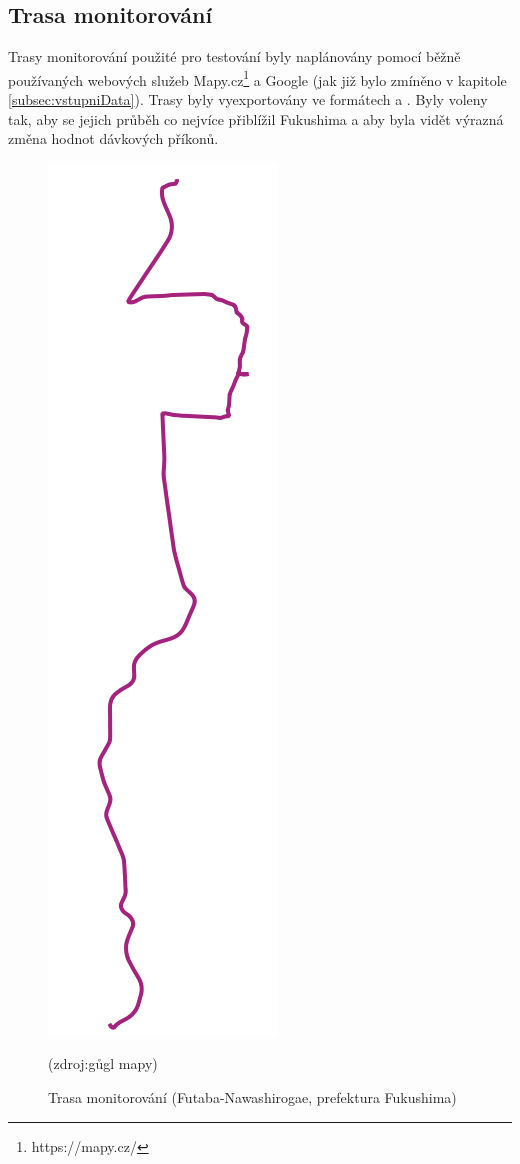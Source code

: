 \subsection{Trasa monitorování}
Trasy monitorování použité pro testování byly naplánovány pomocí běžně používaných webových služeb Mapy.cz\footnote{https://mapy.cz/} a Google (jak již bylo zmíněno v kapitole \ref{subsec:vstupniData}). Trasy byly vyexportovány ve formátech  a . Byly voleny tak, aby se jejich průběh co nejvíce přiblížil  Fukushima a aby byla vidět výrazná změna hodnot dávkových příkonů.

\begin{figure}[H]
    \centering
    \includegraphics[scale=0.2]{./pictures/trasa_monitorovani.png}
      	\caption[Trasa monitorování (Futaba-Nawashirogae, prefektura Fukushima)]{Trasa monitorování (Futaba-Nawashirogae, prefektura Fukushima)}(zdroj:gůgl mapy)
    	\label{fig:interpolatedMap}
\end{figure}


